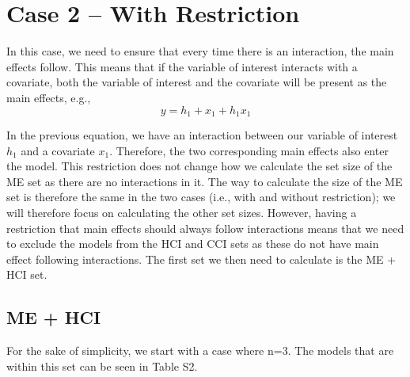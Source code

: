 \section{Case 2 – With Restriction}

In this case, we need to ensure that every time there is an interaction, the main effects follow. This means that if the variable of interest interacts with a covariate, both the variable of interest and the covariate will be present as the main effects, e.g.,
\[y=h_1+x_1+h_1x_1\] 

In the previous equation, we have an interaction between our variable of interest $h_1$ and a covariate $x_1$. Therefore, the two corresponding main effects also enter the model. This restriction does not change how we calculate the set size of the ME set as there are no interactions in it. The way to calculate the size of the ME set is therefore the same in the two cases (i.e., with and without restriction); we will therefore focus on calculating the other set sizes. However, having a restriction that main effects should always follow interactions means that we need to exclude the models from the HCI and CCI sets as these do not have main effect following interactions. The first set we then need to calculate is the ME + HCI set.

\subsection{ME + HCI}
For the sake of simplicity, we start with a case where n=3. The models that are within this set can be seen in Table S2. \\

